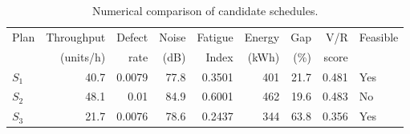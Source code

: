 \begin{table}[htbp]
\centering
\caption{Numerical comparison of candidate schedules.}
\label{tab:numerical-sim}
\small
\begin{tabular}{@{}lrrrrrrrl@{}}
\toprule
Plan & Throughput & Defect & Noise & Fatigue & Energy & Gap & V/R & Feasible \\
     & (units/h)  & rate   & (dB)  & Index   & (kWh)  & (\%) & score &         \\
\midrule
$S_{1}$ & 40.7 & 0.0079 & 77.8 & 0.3501 & 401 & 21.7 & 0.481 & Yes \\
$S_{2}$ & 48.1 & 0.01 & 84.9 & 0.6001 & 462 & 19.6 & 0.483 & No \\
$S_{3}$ & 21.7 & 0.0076 & 78.6 & 0.2437 & 344 & 63.8 & 0.356 & Yes \\
\bottomrule
\end{tabular}
\end{table}
